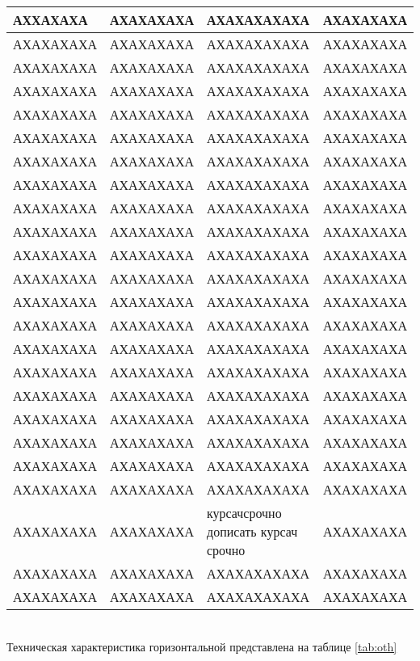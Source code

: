 \begin{supertabular}{|p{3.5cm}|p{3.5cm}|p{3.5cm}|p{3.5cm}|}
АХХАХАХА & АХАХАХАХА & АХАХАХАХАХА & АХАХАХАХА \\ \hline
АХАХАХАХА & АХАХАХАХА & АХАХАХАХАХА & АХАХАХАХА \\ \hline
АХАХАХАХА & АХАХАХАХА & АХАХАХАХАХА & АХАХАХАХА \\ \hline
АХАХАХАХА & АХАХАХАХА & АХАХАХАХАХА & АХАХАХАХА \\ \hline
АХАХАХАХА & АХАХАХАХА & АХАХАХАХАХА & АХАХАХАХА \\ \hline
АХАХАХАХА & АХАХАХАХА & АХАХАХАХАХА & АХАХАХАХА \\ \hline
АХАХАХАХА & АХАХАХАХА & АХАХАХАХАХА & АХАХАХАХА \\ \hline
АХАХАХАХА & АХАХАХАХА & АХАХАХАХАХА & АХАХАХАХА \\ \hline
АХАХАХАХА & АХАХАХАХА & АХАХАХАХАХА & АХАХАХАХА \\ \hline
АХАХАХАХА & АХАХАХАХА & АХАХАХАХАХА & АХАХАХАХА \\ \hline
АХАХАХАХА & АХАХАХАХА & АХАХАХАХАХА & АХАХАХАХА \\\hline
АХАХАХАХА & АХАХАХАХА & АХАХАХАХАХА & АХАХАХАХА \\\hline
АХАХАХАХА & АХАХАХАХА & АХАХАХАХАХА & АХАХАХАХА \\\hline
АХАХАХАХА & АХАХАХАХА & АХАХАХАХАХА & АХАХАХАХА \\\hline
АХАХАХАХА & АХАХАХАХА & АХАХАХАХАХА & АХАХАХАХА \\\hline
АХАХАХАХА & АХАХАХАХА & АХАХАХАХАХА & АХАХАХАХА \\\hline
АХАХАХАХА & АХАХАХАХА & АХАХАХАХАХА & АХАХАХАХА \\\hline
АХАХАХАХА & АХАХАХАХА & АХАХАХАХАХА & АХАХАХАХА \\\hline
АХАХАХАХА & АХАХАХАХА & АХАХАХАХАХА & АХАХАХАХА \\\hline
АХАХАХАХА & АХАХАХАХА & АХАХАХАХАХА & АХАХАХАХА \\\hline
АХАХАХАХА & АХАХАХАХА & АХАХАХАХАХА & АХАХАХАХА \\\hline
АХАХАХАХА & АХАХАХАХА & курсачсрочно дописать курсач срочно & АХАХАХАХА \\\hline
АХАХАХАХА & АХАХАХАХА & АХАХАХАХАХА & АХАХАХАХА \\\hline
АХАХАХАХА & АХАХАХАХА & АХАХАХАХАХА & АХАХАХАХА \\\hline
\end{supertabular}\\

Техническая характеристика горизонтальной представлена на таблице \ref{tab:oth}